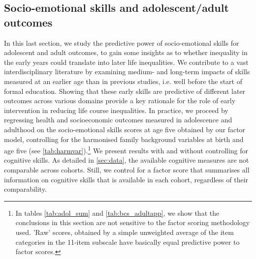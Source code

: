 \subsection{Socio-emotional skills and adolescent/adult outcomes}

In this last section, we study the predictive power of socio-emotional skills for adolescent and adult outcomes, to gain some insights as to whether inequality in the early years could translate into later life inequalities. We contribute to a vast interdisciplinary literature by examining medium- and long-term impacts of skills measured at an earlier age than in previous studies, i.e. well before the start of formal education. Showing that these early skills are predictive of different later outcomes across various domains provide a key rationale for the role of early intervention in reducing life course inequalities. In practice, we proceed by regressing health and socioeconomic outcomes measured in adolescence and adulthood on the socio-emotional skills scores at age five obtained by our factor model, controlling for the harmonised family background variables at birth and age five (see \autoref{tab:harmvar}).\footnote{In tables \ref{tab:adol_sum} and \ref{tab:bcs_adultapp}, we show that the conclusions in this section are not sensitive to the factor scoring methodology used. 'Raw' scores, obtained by a simple unweighted average of the item categories in the 11-item subscale have basically equal predictive power to factor scores.} We present results with and without controlling for cognitive skills. As detailed in \autoref{sec:data}, the available cognitive measures are not comparable across cohorts. Still, we control for a factor score that summarises all information on cognitive skills that is available in each cohort, regardless of their comparability.

